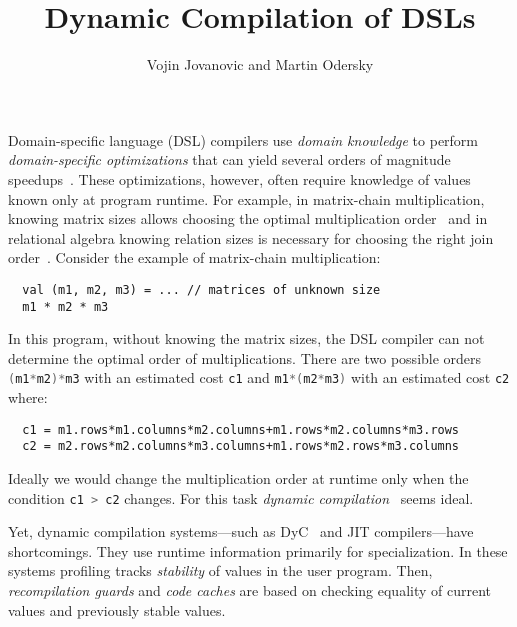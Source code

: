 \documentclass{llncs}
\newcommand{\scode}[1]{\lstinline[language=Scala,columns=fixed,basicstyle=\ttfamily,keywordstyle=\ttfamily]|#1|}
\newcommand{\code}[1]{\scode{#1}}
\begin{document}
\title{Dynamic Compilation of DSLs}

\author{Vojin Jovanovic and Martin Odersky}

\maketitle

Domain-specific language (DSL) compilers use \emph{domain knowledge} to perform
 \emph{domain-specific optimizations} that can yield several orders of magnitude speedups~\cite{rompf_optimizing_2013}.
 These optimizations, however, often require knowledge of values known only at program runtime. For example,
 in matrix-chain multiplication, knowing matrix sizes allows choosing the
 optimal multiplication order~\cite[Ch.~15.2]{cormen2001introduction} and
 in relational algebra knowing relation sizes is necessary for choosing the right join order~\cite{selinger1979access}.
 Consider the example of matrix-chain multiplication:
\vspace{0.5em}
\begin{lstlisting}
  val (m1, m2, m3) = ... // matrices of unknown size
  m1 * m2 * m3
\end{lstlisting}
\vspace{0.5em}
In this program, without knowing the matrix sizes, the DSL compiler can not determine the
 optimal order of multiplications. There are two possible orders
 \code{(m1*m2)*m3} with an estimated cost \code{c1} and \code{m1*(m2*m3)} with an estimated cost \code{c2} where:
 \vspace{0.5em}
\begin{lstlisting}
  c1 = m1.rows*m1.columns*m2.columns+m1.rows*m2.columns*m3.rows
  c2 = m2.rows*m2.columns*m3.columns+m1.rows*m2.rows*m3.columns
\end{lstlisting}
\vspace{0.5em}
Ideally we would change the multiplication order at runtime only when the condition \code{c1 > c2} changes. For this
task \emph{dynamic compilation}~\cite{auslander1996fast} seems ideal.

Yet, dynamic compilation systems---such as DyC~\cite{grant2000dyc} and JIT compilers---have shortcomings.
 They use runtime information primarily for specialization. In these systems
 profiling tracks \emph{stability} of values in the user program. Then, \emph{recompilation guards}
 and \emph{code caches} are based on checking equality of current values and previously stable
 values.
\end{document}
